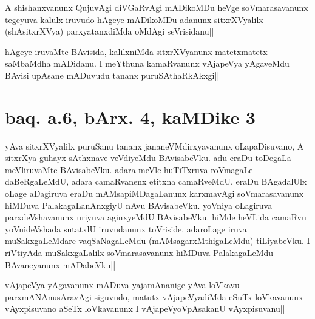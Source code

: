 
\begin{artha}
A shishanxvanunx QujuvAgi diVGaRvAgi mADikoMDu heVge soVmarasavanunx 
tegeyuva kalulx iruvudo hAgeye mADikoMDu adanunx sitxrXVyalilx 
(shAsitxrXVya) parxyatanxdiMda oMdAgi seVrisidanu||
\end{artha}


\begin{artha}
hAgeye iruvaMte BAvisida, kalilxniMda sitxrXVyanunx matetxmatetx 
saMbaMdha mADidanu. I meYthuna kamaRvanunx vAjapeVya yAgaveMdu BAvisi 
upAsane mADuvudu tananx puruSAthaRkAkxgi||
\end{artha}


\section*{baq. a.6, bArx. 4, kaMDike 3}

\stext

\begin{artha}
yAva sitxrXVyalilx puruSanu tananx jananeVMdirxyavanunx oLapaDisuvano, 
A sitxrXya guhayx sAthxnave veVdiyeMdu BAvisabeVku. adu eraDu toDegaLa 
meVliruvaMte BAvisabeVku. adara meVle huTiTxruva roVmagaLe 
daBeRgaLeMdU, adara camaRvanenx etitxna camaRveMdU, eraDu BAgadalUlx 
oLage aDagiruva eraDu mAMsapiMDagaLanunx karxmavAgi soVmarasavanunx 
hiMDuva PalakagaLanAnxgiyU nAvu BAvisabeVku. yoVniya oLagiruva 
parxdeVshavanunx uriyuva aginxyeMdU BAvisabeVku. hiMde heVLida camaRvu 
yoVnideVshada sutatxlU iruvudanunx toVriside. adaroLage iruva 
muSakxgaLeMdare vaqSaNagaLeMdu (mAMsagarxMthigaLeMdu) tiLiyabeVku. I 
riVtiyAda muSakxgaLalilx soVmarasavanunx hiMDuva PalakagaLeMdu 
BAvaneyanunx mADabeVku|| 
\end{artha}


\begin{artha}
vAjapeVya yAgavanunx mADuva yajamAnanige yAva loVkavu 
parxmANAnusAravAgi siguvudo, matutx vAjapeVyadiMda eSuTx loVkavanunx 
vAyxpisuvano aSeTx loVkavanunx I vAjapeVyoVpAsakanU vAyxpisuvanu||
\end{artha}


